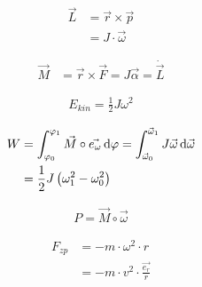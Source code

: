 \begin{boxleft}
\end{boxleft}\begin{boxrightshaded}
\begin{align}
\vec{L}&=\vec{r}\times\vec{p} \\
&=J\cdot \vec{\omega}
\end{align}
\end{boxrightshaded}

\begin{boxleft}
\end{boxleft}\begin{boxrightshaded}
\begin{align}
\vec{M}&=\vec{r}\times\vec{F}=J\vec{\alpha}=\dot{\vec{L}}
\end{align}
\end{boxrightshaded}

\begin{boxleft}
\end{boxleft}\begin{boxrightshaded}
\begin{align}
E_{kin}=\frac{1}{2}J\omega^2
\end{align}
\end{boxrightshaded}

\begin{boxleft}
\end{boxleft}\begin{boxrightshaded}
\begin{align}
W	&=\int_{\varphi_0}^{\varphi_1}\vec{M}\circ\vec{e_\omega}\mathop{}\!\mathrm{d} \varphi=\int_{\vec{\omega}_0}^{\vec{\omega}_1}J\vec{\omega}\mathop{}\!\mathrm{d}\vec{\omega}\\
&=\frac{1}{2}J\left(\omega_1^2-\omega_0^2\right)
\end{align}
\end{boxrightshaded}


\begin{boxleft}
\end{boxleft}\begin{boxrightshaded}
\begin{align}
P=\vec{M}\circ\vec{\omega}
\end{align}
\end{boxrightshaded}

\begin{boxleft}
\end{boxleft}\begin{boxrightshaded}
\begin{align}
F_{zp}&=-m\cdot\omega^2\cdot r\\
&=-m\cdot v^2\cdot \frac{\vec{e_r}}{r}
\end{align}
\end{boxrightshaded}

